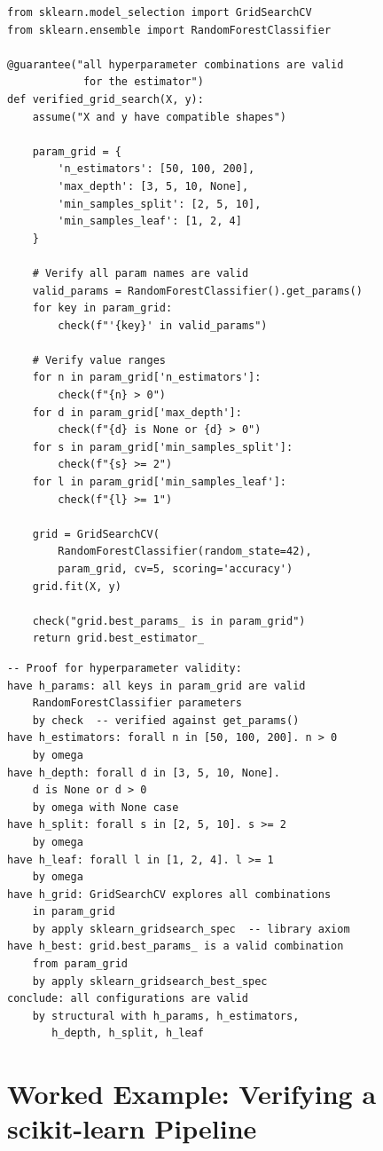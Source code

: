 \documentclass[11pt,a4paper]{report}
\theoremstyle{definition}
\theoremstyle{plain}
\begin{document}
\begin{lstlisting}[style=synhopy]
from sklearn.model_selection import GridSearchCV
from sklearn.ensemble import RandomForestClassifier

@guarantee("all hyperparameter combinations are valid
            for the estimator")
def verified_grid_search(X, y):
    assume("X and y have compatible shapes")

    param_grid = {
        'n_estimators': [50, 100, 200],
        'max_depth': [3, 5, 10, None],
        'min_samples_split': [2, 5, 10],
        'min_samples_leaf': [1, 2, 4]
    }

    # Verify all param names are valid
    valid_params = RandomForestClassifier().get_params()
    for key in param_grid:
        check(f"'{key}' in valid_params")

    # Verify value ranges
    for n in param_grid['n_estimators']:
        check(f"{n} > 0")
    for d in param_grid['max_depth']:
        check(f"{d} is None or {d} > 0")
    for s in param_grid['min_samples_split']:
        check(f"{s} >= 2")
    for l in param_grid['min_samples_leaf']:
        check(f"{l} >= 1")

    grid = GridSearchCV(
        RandomForestClassifier(random_state=42),
        param_grid, cv=5, scoring='accuracy')
    grid.fit(X, y)

    check("grid.best_params_ is in param_grid")
    return grid.best_estimator_
\end{lstlisting}

\begin{lstlisting}[style=proof]
-- Proof for hyperparameter validity:
have h_params: all keys in param_grid are valid
    RandomForestClassifier parameters
    by check  -- verified against get_params()
have h_estimators: forall n in [50, 100, 200]. n > 0
    by omega
have h_depth: forall d in [3, 5, 10, None].
    d is None or d > 0
    by omega with None case
have h_split: forall s in [2, 5, 10]. s >= 2
    by omega
have h_leaf: forall l in [1, 2, 4]. l >= 1
    by omega
have h_grid: GridSearchCV explores all combinations
    in param_grid
    by apply sklearn_gridsearch_spec  -- library axiom
have h_best: grid.best_params_ is a valid combination
    from param_grid
    by apply sklearn_gridsearch_best_spec
conclude: all configurations are valid
    by structural with h_params, h_estimators,
       h_depth, h_split, h_leaf
\end{lstlisting}

\section{Worked Example: Verifying a scikit-learn Pipeline}
\end{document}
